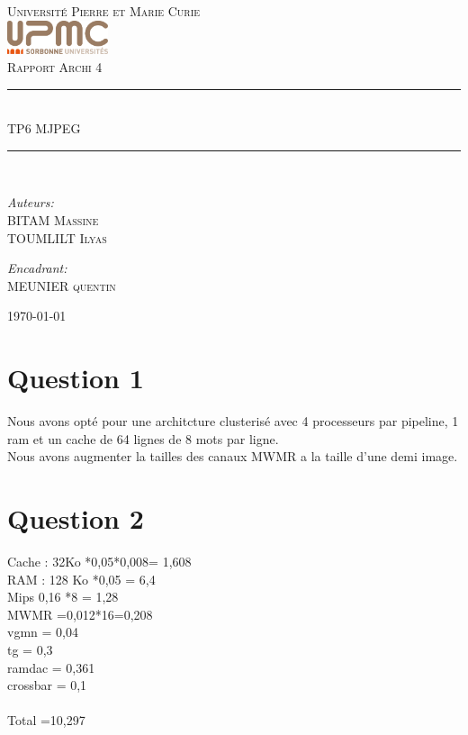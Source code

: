 \documentclass[12pt]{article}
\newcommand{\HRule}{\rule{\linewidth}{0.5mm}}
\begin{document}
\begin{titlepage}
  \begin{center}
    \textsc{\LARGE Université Pierre et Marie Curie}\\[1.5cm]
    \includegraphics[height=1cm]{upmc.png}\\[1.5cm]
    \textsc{\Large Rapport Archi 4 }\\[2cm]
    \HRule \\[1cm]
    \textsc{\huge TP6 MJPEG }\\[0.5cm]
    \HRule \\[1cm]
    \noindent
    \begin{minipage}[t]{0.55\textwidth}
      \begin{flushleft} \large
        \emph{Auteurs:}\\
        BITAM \textsc{Massine}\\
        TOUMLILT \textsc{Ilyas}
      \end{flushleft}
    \end{minipage}%
    \begin{minipage}[t]{0.47\textwidth}
      \begin{flushright} \large
        \emph{Encadrant:} \\
        MEUNIER \textsc{quentin}
      \end{flushright}
    \end{minipage}
    \vfill
    {\large \today}
  \end{center}
\end{titlepage}
\section*{Question 1}
Nous avons opté pour une architcture clusterisé avec 4 processeurs par pipeline, 1 ram et un cache de 64 lignes de 8 mots par ligne.\\
Nous avons augmenter la tailles des canaux MWMR a la taille d'une demi image.
\section*{Question 2}
Cache : 32Ko *0,05*0,008= 1,608\\
RAM : 128 Ko *0,05 = 6,4\\
Mips 0,16 *8 = 1,28\\
MWMR =0,012*16=0,208\\
vgmn = 0,04\\
tg = 0,3\\
ramdac = 0,361\\
crossbar = 0,1\\
\\
	Total =10,297
\end{document}
